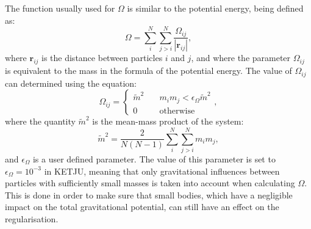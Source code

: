 \documentclass[english, twoside]{HYgradu}
\begin{document}
The function usually used for $\Omega$ is similar to the potential energy, being defined as:
\begin{equation}
\Omega = \displaystyle\sum^N_i \displaystyle\sum^N_{j > i} \frac{\Omega_{ij}}{|\mathbf{r}_{ij}|}, \label{eq:ketju_omega}
\end{equation}
where $\mathbf{r}_{ij}$ is the distance between particles $i$ and $j$, and where the parameter $\Omega_{ij}$ is equivalent to the mass in the formula of the potential energy. The value of $\Omega_{ij}$ can determined using the equation:
\begin{equation}
\Omega_{ij} = 
\begin{cases}
\tilde{m}^2 &\quad m_i m_j < \epsilon_\Omega \tilde{m}^2 \\
0 &\quad \mathrm{otherwise}
\end{cases},
\end{equation}
where the quantity $\tilde{m}^2$ is the mean-mass product of the system:
\begin{equation}
\tilde{m}^2 = \frac{2}{N(N-1)} \displaystyle\sum^N_i \displaystyle\sum^N_{j > i} m_i m_j,
\end{equation}
and $\epsilon_\Omega$ is a user defined parameter. The value of this parameter is set to $\epsilon_\Omega = 10^{-3}$ in KETJU, meaning that only gravitational influences between particles with sufficiently small masses is taken into account when calculating $\Omega$. This is done in order to make sure that small bodies, which have a negligible impact on the total gravitational potential, can still have an effect on the regularisation. 
\end{document}
